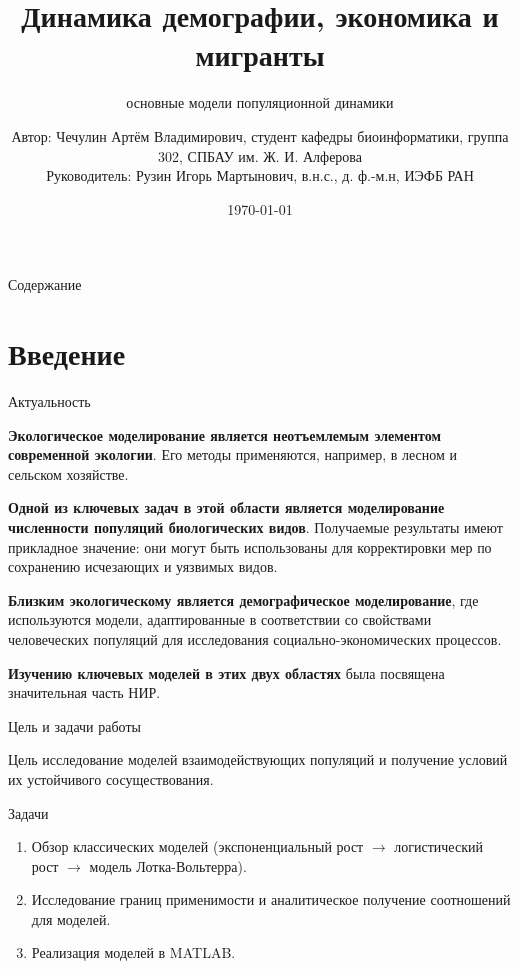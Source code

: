 \documentclass[12pt]{beamer}
\title{Динамика демографии, экономика и мигранты}
\subtitle{основные модели популяционной динамики}
\author[Чечулин Артём Владимирович]{
    Автор: Чечулин Артём Владимирович, студент кафедры биоинформатики, группа 302, СПБАУ им. Ж. И. Алферова \\
    Руководитель: Рузин Игорь Мартынович, в.н.с., д. ф.-м.н, ИЭФБ РАН
}
\date{\today}
\begin{document}
\begin{frame}
\titlepage
\end{frame}

\begin{frame}{Содержание}
\tableofcontents
\end{frame}

\section{Введение}

\begin{frame}{Актуальность}

\textbf{Экологическое моделирование является неотъемлемым элементом современной экологии}. Его методы применяются, например, в лесном и сельском хозяйстве.

\textbf{Одной из ключевых задач в этой области является моделирование численности популяций биологических видов}. Получаемые результаты имеют прикладное значение: они могут быть использованы для корректировки мер по сохранению исчезающих и уязвимых видов.

\textbf{Близким экологическому является демографическое моделирование}, где используются модели, адаптированные в соответствии со свойствами человеческих популяций для исследования социально-экономических процессов.

\textbf{Изучению ключевых моделей в этих двух областях} была посвящена значительная часть НИР.

\end{frame}

\begin{frame}{Цель и задачи работы}

\begin{block}{Цель}
исследование моделей взаимодействующих популяций и получение условий их устойчивого сосуществования.
\end{block}

\begin{exampleblock}{Задачи}
\begin{enumerate}
    \item Обзор классических моделей (экспоненциальный рост $\to$ логистический рост $\to$ модель Лотка-Вольтерра).
    \item Исследование границ применимости и аналитическое получение соотношений для моделей.
    \item Реализация моделей в MATLAB.
\end{enumerate}
\end{exampleblock}
\end{frame}
\end{document}
